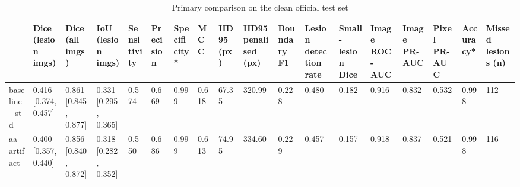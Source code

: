 \begin{table}
\caption{Primary comparison on the clean official test set}
\label{tab:table1_main_clean}
\begin{tabular}{llllllllllllllllll}
\toprule
 & Dice (lesion imgs) & Dice (all imgs) & IoU (lesion imgs) & Sensitivity & Precision & Specificity* & MCC & HD95 (px) & HD95 penalised (px) & Boundary F1 & Lesion detection rate & Small-lesion Dice & Image ROC-AUC & Image PR-AUC & Pixel PR-AUC & Accuracy* & Missed lesions (n) \\
\midrule
baseline\_std & 0.416 [0.374, 0.457] & 0.861 [0.845, 0.877] & 0.331 [0.295, 0.365] & 0.574 & 0.669 & 0.999 & 0.618 & 67.35 & 320.99 & 0.228 & 0.480 & 0.182 & 0.916 & 0.832 & 0.532 & 0.998 & 112 \\
aa\_artifact & 0.400 [0.357, 0.440] & 0.856 [0.840, 0.872] & 0.318 [0.282, 0.352] & 0.550 & 0.686 & 0.999 & 0.613 & 74.95 & 334.60 & 0.229 & 0.457 & 0.157 & 0.918 & 0.837 & 0.521 & 0.998 & 116 \\
\bottomrule
\end{tabular}
\end{table}
